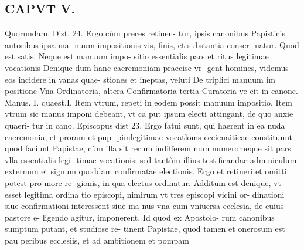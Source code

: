 \documentclass{article}
\begin{document}
\begin{pages}
\section*{CAPVT  V. }
\marginpar{[ p.361 ]}\pstart Quorundam. Dist. 24. Ergo cùm preces retinen- tur, ipsis canonibus Papisticis autoribus ipsa ma- nuum impositionis vis, finis, et substantia conser- uatur. Quod est satis. Neque est manuum impo- sitio essentialis pars et ritus legitimae vocationis  \pend\pstart Denique dum hanc caeremoniam praecise vr- gent homines, videmus eos incidere in vanas quae- stiones et ineptas, veluti De triplici manuum im positione Vna Ordinatoria, altera Confirmatoria tertia Curatoria ve eit in canone. Manus. I. quaest.I.  \pend\pstart Item vtrum, repeti in eodem possit manuum impositio.  \pend\pstart Item vtrum sic manus imponi debeant, vt ca put ipsum electi attingant, de quo anxie quaeri- tur in cano. Episcopus dist 23. Ergo fatui sunt, qui haerent in ea nuda caeremonia, et proram et pup- pimlegitimae vocatloms cecienaitieae constituunt quod faciunt Papistae, cùm illa sit rerum indifferem num numeromeque sit pars vlla essentialis legi- timae vocationis: sed tantùm illius testificandae adminiculum externum et signum quoddam confirmatae electionis.  \pend\pstart Ergo et retineri et omitti potest pro more re- gionis, in qua electus ordinatur.  \pend\pstart Additum est denique, vt esset legitima ordina tio episcopi, nimirum vt tres episcopi vicini or- dinationi siue confirmationi interessent siue ma nus vna cum vniuersa ecclesia, de cuius pastore e- ligendo agitur, imponerent. Id quod ex Apostolo- rum canonibus sumptum putant, et studiose re- tinent Papistae, quod tamen et onerosum est pau peribus ecclesiis, et ad ambitionem et pompam  \pend

\end{pages}
\end{document}
